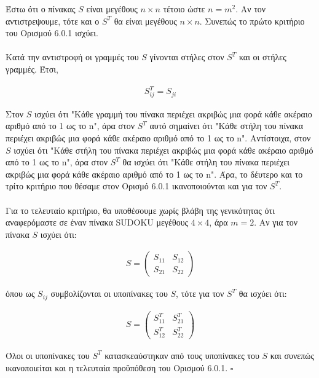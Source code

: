 \documentclass[12pt]{book}
\theoremstyle{definition}
\begin{document}
Έστω ότι ο πίνακας \(S\) είναι μεγέθους \(n \times n\) τέτοιο ώστε \(n = m^2\). Αν τον αντιστρεψουμε, τότε και ο \(S^{T}\) θα είναι μεγέθους \(n \times n\). Συνεπώς το πρώτο κριτήριο του Ορισμού 6.0.1 ισχύει. \\ \\

Κατά την αντιστροφή οι γραμμές του \(S\) γίνονται στήλες στον \(S^{T}\) και οι στήλες γραμμές. Έτσι, 

\begin{align*}
	S^{T}_{ij} = S_{ji}
\end{align*}

Στον \(S\) ισχύει ότι "Κάθε γραμμή του πίνακα περιέχει ακριβώς μια φορά κάθε ακέραιο αριθμό από το 1 ως το n", άρα στον \(S^{T}\) αυτό σημαίνει ότι "Κάθε στήλη του πίνακα περιέχει ακριβώς μια φορά κάθε ακέραιο αριθμό από το 1 ως το n". Αντίστοιχα, στον \(S\) ισχύει ότι "Κάθε στήλη του πίνακα περιέχει ακριβώς μια φορά κάθε ακέραιο αριθμό από το 1 ως το n", άρα στον \(S^{T}\) θα ισχύει ότι "Κάθε στήλη του πίνακα περιέχει ακριβώς μια φορά κάθε ακέραιο αριθμό από το 1 ως το n". Άρα, το δέυτερο και το τρίτο κριτήριο που θέσαμε στον Ορισμό 6.0.1 ικανοποιούνται και για τον \(S^{T}\). \\ \\ 

Για το τελευταίο κριτήριο, θα υποθέσουμε χωρίς βλάβη της γενικότητας ότι αναφερόμαστε σε έναν πίνακα SUDOKU μεγέθους \(4 \times 4\), άρα \(m = 2\). Αν για τον πίνακα \(S\) ισχύει ότι: 

\begin{align*}
	S = \begin{pmatrix}
		S_{11} & S_{12} \\
		S_{21} & S_{22}
	\end{pmatrix}
\end{align*}

όπου ως \(S_{ij}\) συμβολίζονται οι υποπίνακες του \(S\), τότε για τον \(S^{T}\) θα ισχύει ότι: 

\begin{align*}
	S = \begin{pmatrix}
		S_{11}^{T} & S_{21}^{T} \\
		S_{12}^{T} & S_{22}^{T}
	\end{pmatrix}
\end{align*}

Όλοι οι υποπίνακες του \(S^{T}\) κατασκεαύστηκαν από τους υποπίνακες του \(S\) και συνεπώς ικανοποιείται και η τελευταία προϋπόθεση του Ορισμού 6.0.1. \(\square\)
\end{document}
